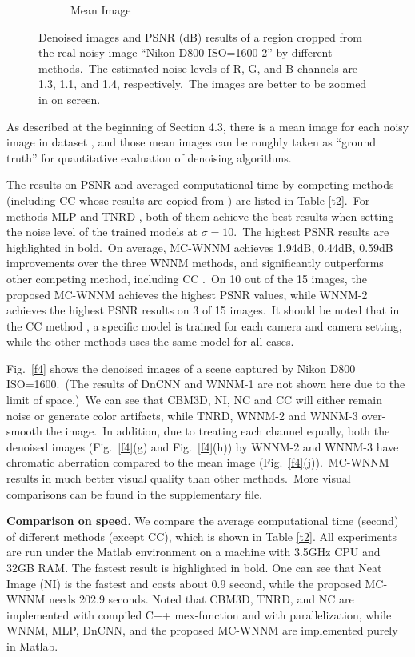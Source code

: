 \begin{figure}
\begin{subfigure}[t]{0.19\textwidth}
		\caption{Mean Image}
    \end{subfigure}
    \caption{Denoised images and PSNR (dB) results of a region cropped from the real noisy image ``Nikon D800 ISO=1600 2'' \cite{crosschannel2016} by different methods.\ The estimated noise levels of R, G, and B channels are 1.3, 1.1, and 1.4, respectively.\ The images are better to be zoomed in on screen.}
    \label{fig4}
\end{figure}

\quad As described at the beginning of Section 4.3, there is a mean image for each noisy image in dataset \cite{crosschannel2016}, and those mean images can be roughly taken as ``ground truth'' for quantitative evaluation of denoising algorithms.

The results on PSNR and averaged computational time by competing methods (including CC \cite{crosschannel2016} whose results are copied from \cite{crosschannel2016}) are listed in Table \ref{t2}.\ For methods MLP \cite{mlp} and TNRD \cite{chen2015learning}, both of them achieve the best results when setting the noise level of the trained models at $\sigma=10$.\ The highest PSNR results are highlighted in bold.\ On average, MC-WNNM achieves 1.94dB, 0.44dB, 0.59dB improvements over the three WNNM methods, and significantly outperforms other competing method, including CC \cite{crosschannel2016}.\ On 10 out of the 15 images, the proposed MC-WNNM achieves the highest PSNR values, while WNNM-2 achieves the highest PSNR results on 3 of 15 images.\ It should be noted that in the CC method \cite{crosschannel2016}, a specific model is trained for each camera and camera setting, while the other methods uses the same model for all cases. 

Fig.\ \ref{f4} shows the denoised images of a scene captured by Nikon D800 ISO=1600.\ (The results of DnCNN and WNNM-1 are not shown here due to the limit of space.)\ We can see that CBM3D, NI, NC and CC will either remain noise or generate color artifacts, while TNRD, WNNM-2 and WNNM-3 over-smooth the image.\ In addition, due to treating each channel equally, both the denoised images (Fig.\ \ref{f4}(g) and Fig.\ \ref{f4}(h)) by WNNM-2 and WNNM-3 have chromatic aberration compared to the mean image (Fig.\ \ref{f4}(j)).\ MC-WNNM results in much better visual quality than other methods.\ More visual comparisons can be found in the supplementary file.

\textbf{Comparison on speed}. We compare the average computational time (second) of different methods (except CC), which is shown in Table \ref{t2}. All experiments are run under the Matlab environment on a machine with 3.5GHz CPU and 32GB RAM. The fastest result is highlighted in bold. One can see that Neat Image (NI) is the fastest and costs about 0.9 second, while the proposed MC-WNNM needs 202.9 seconds. Noted that CBM3D, TNRD, and NC are implemented with compiled C++ mex-function and with parallelization, while WNNM, MLP, DnCNN, and the proposed MC-WNNM are implemented purely in Matlab.


